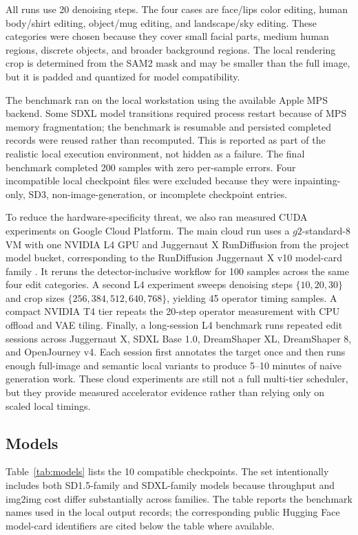 \documentclass[final,5p,times,number,sort&compress]{elsarticle}
\begin{document}
All runs use 20 denoising steps. The four cases are face/lips color editing, human body/shirt editing, object/mug editing, and landscape/sky editing. These categories were chosen because they cover small facial parts, medium human regions, discrete objects, and broader background regions. The local rendering crop is determined from the SAM2 mask and may be smaller than the full image, but it is padded and quantized for model compatibility.

The benchmark ran on the local workstation using the available Apple MPS backend. Some SDXL model transitions required process restart because of MPS memory fragmentation; the benchmark is resumable and persisted completed records were reused rather than recomputed. This is reported as part of the realistic local execution environment, not hidden as a failure. The final benchmark completed 200 samples with zero per-sample errors. Four incompatible local checkpoint files were excluded because they were inpainting-only, SD3, non-image-generation, or incomplete checkpoint entries.

To reduce the hardware-specificity threat, we also ran measured CUDA experiments on Google Cloud Platform. The main cloud run uses a \(g2\)-standard-8 VM with one NVIDIA L4 GPU and Juggernaut X RunDiffusion from the project model bucket, corresponding to the RunDiffusion Juggernaut X v10 model-card family \citep{hfJuggernautXV10}. It reruns the detector-inclusive workflow for 100 samples across the same four edit categories. A second L4 experiment sweeps denoising steps \(\{10,20,30\}\) and crop sizes \(\{256,384,512,640,768\}\), yielding 45 operator timing samples. A compact NVIDIA T4 tier repeats the 20-step operator measurement with CPU offload and VAE tiling. Finally, a long-session L4 benchmark runs repeated edit sessions across Juggernaut X, SDXL Base 1.0, DreamShaper XL, DreamShaper 8, and OpenJourney v4. Each session first annotates the target once and then runs enough full-image and semantic local variants to produce 5--10 minutes of naive generation work. These cloud experiments are still not a full multi-tier scheduler, but they provide measured accelerator evidence rather than relying only on scaled local timings.

\subsection{Models}

Table~\ref{tab:models} lists the 10 compatible checkpoints. The set intentionally includes both SD1.5-family and SDXL-family models because throughput and img2img cost differ substantially across families. The table reports the benchmark names used in the local output records; the corresponding public Hugging Face model-card identifiers are cited below the table where available.
\end{document}
